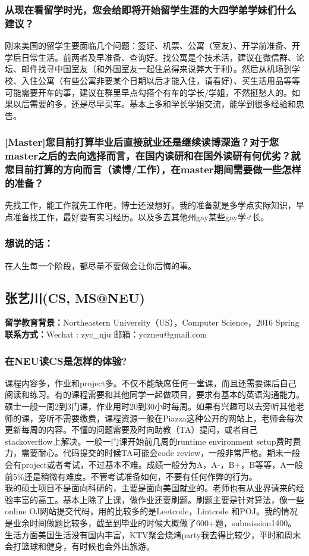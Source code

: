 \documentclass[a4paper,UTF8]{book}
\begin{document}
    \subsubsection*{从现在看留学时光，您会给即将开始留学生涯的大四学弟学妹们什么建议？}
    刚来美国的留学生要面临几个问题：签证、机票、公寓（室友）、开学前准备、开学后日常生活。前两者及早准备、查询好。找公寓是个技术活，建议在微信群、论坛、邮件找寻中国室友（和外国室友一起住总得来说弊大于利）。然后从机场到学校、入住公寓（有些公寓非要某个日期以后才能入住，请看好）、买生活用品等等可能需要开车的事，建议在群里早点勾搭个有车的学长/学姐，不然挺愁人的。如果以后需要的多，还是尽早买车。基本上多和学长学姐交流，能学到很多经验和忠告。

    \subsubsection*{[Master]您目前打算毕业后直接就业还是继续读博深造？对于您master之后的去向选择而言，在国内读研和在国外读研有何优劣？就您目前打算的方向而言（读博/工作），在master期间需要做一些怎样的准备？}
    先找工作，能工作就先工作吧，博士还没想好。我的准备就是多学点实际知识，早点准备找工作，最好要有实习经历。以及多去其他州gay某些gay学♂长。

    \subsubsection{想说的话：}
    在人生每一个阶段，都尽量不要做会让你后悔的事。

\clearpage
\subsection{张艺川(CS, MS@NEU)}
    \textbf{留学教育背景：}Northeastern University（US），Computer Science，2016 Spring\\
    \textbf{联系方式：}Wechat : zyc\_nju  邮箱：yczneu@gmail.com

    \subsubsection*{在NEU读CS是怎样的体验?}
    课程内容多，作业和project多。不仅不能缺席任何一堂课，而且还需要课后自己阅读和练习。有的课程需要和其他同学一起做项目，要求有基本的英语沟通能力。硕士一般一周2到3门课，作业用时20到30小时每周。如果有兴趣可以去旁听其他老师的课，旁听不需要缴费，课程资源一般在Piazza这种公开的网站上，老师会每次更新每周的内容。不懂的问题需要及时向助教（TA）提问，或者自己stackoverflow上解决。一般一门课开始前几周的runtime environment setup费时费力，需要耐心。代码提交的时候TA可能会code review，一般非常严格。期末一般会有project或者考试，不过基本不难。成绩一般分为A，A-，B+，B等等，A一般前5\%还是稍微有难度。不管考试准备如何，不要有任何作弊的行为。\\
    我的硕士项目不是面向科研的，主要是面向美国就业的。老师也有从业界请来的经验丰富的高工。基本上除了上课，做作业还要刷题。刷题主要是针对算法，像一些online OJ网站提交代码，用的比较多的是Leetcode，Lintcode 和POJ。我的情况是业余时间做题比较多，截至到毕业的时候大概做了600+题，submission1400。
    生活方面美国生活没有国内丰富，KTV聚会烧烤party我去得比较少，平时和周末会打篮球和健身，有时候也会外出旅游。
\end{document}
